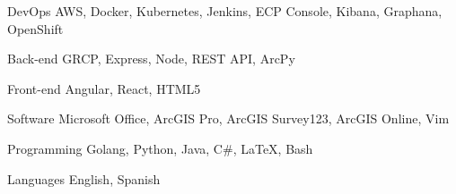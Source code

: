 

\begin{cvskills}

  \cvskill
    {DevOps} %
    {AWS, Docker, Kubernetes, Jenkins, ECP Console, Kibana, Graphana, OpenShift} %

  \cvskill
    {Back-end} %
    {GRCP, Express, Node, REST API, ArcPy} %

  \cvskill
    {Front-end} %
    {Angular, React, HTML5} %

  \cvskill
    {Software} %
    {Microsoft Office, ArcGIS Pro, ArcGIS Survey123, ArcGIS Online, Vim} %

  \cvskill
    {Programming} %
    {Golang, Python, Java, C\#, LaTeX, Bash} %

  \cvskill
    {Languages} %
    {English, Spanish} %

\end{cvskills}
